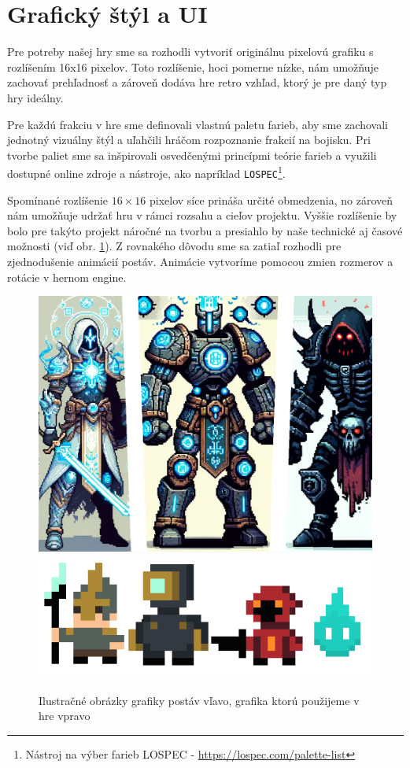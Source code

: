 \section{Grafický štýl a UI}

Pre potreby našej hry sme sa rozhodli vytvoriť originálnu pixelovú grafiku s rozlíšením 16x16 pixelov. Toto rozlíšenie, hoci pomerne nízke, nám umožňuje zachovať prehľadnosť a zároveň dodáva hre retro vzhľad, ktorý je pre daný typ hry ideálny.

Pre každú frakciu v hre sme definovali vlastnú paletu farieb, aby sme zachovali jednotný vizuálny štýl a uľahčili hráčom rozpoznanie frakcií na bojisku. Pri tvorbe paliet sme sa inšpirovali osvedčenými princípmi teórie farieb a využili dostupné online zdroje a nástroje, ako napríklad \verb|LOSPEC|\footnote{Nástroj na výber farieb LOSPEC - \url{https://lospec.com/palette-list}}.

Spomínané rozlíšenie $16\times16$ pixelov síce prináša určité obmedzenia, no zároveň nám umožňuje udržať hru v rámci rozsahu a cieľov projektu. Vyššie rozlíšenie by bolo pre takýto projekt náročné na tvorbu a presiahlo by naše technické aj časové možnosti (viď obr. \ref{fig:chars}). Z rovnakého dôvodu sme sa zatiaľ rozhodli pre zjednodušenie animácií postáv. Animácie vytvoríme pomocou zmien rozmerov a rotácie v hernom engine.

\begin{figure}[H]
    \raggedright
    \includegraphics[width=0.45\linewidth]{obrazky-figures/chars.png}
    \includegraphics[width=0.5\linewidth]{obrazky-figures/chars2.png}
    \caption{Ilustračné obrázky grafiky postáv vľavo, grafika ktorú použijeme v hre vpravo}
    \label{fig:chars}
\end{figure}

